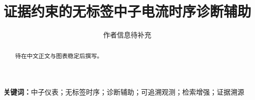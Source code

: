 \documentclass[UTF8,10pt,a4paper,twocolumn]{ctexart}
\title{证据约束的无标签中子电流时序诊断辅助}
\author{作者信息待补充}
\date{}
\begin{document}
\raggedbottom
\maketitle

\begin{abstract}
待在中文正文与图表稳定后撰写。
\end{abstract}

\noindent\textbf{关键词：}中子仪表；无标签时序；诊断辅助；可追溯观测；检索增强；证据溯源








\clearpage


\end{document}

